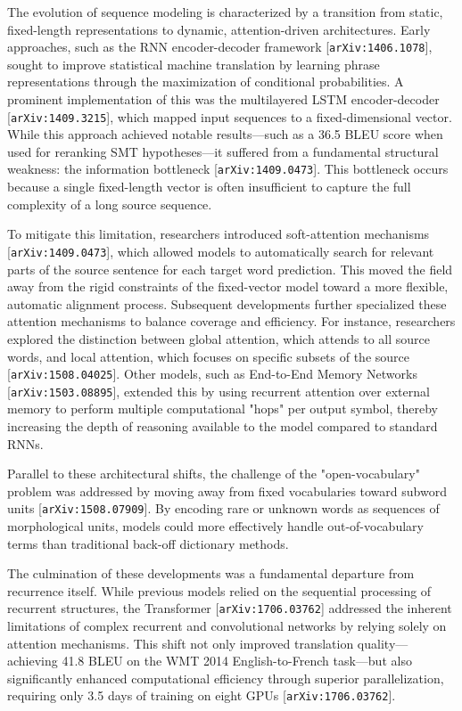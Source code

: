 \documentclass[11pt]{article}
\begin{document}
The evolution of sequence modeling is characterized by a transition from static, fixed-length representations to dynamic, attention-driven architectures. Early approaches, such as the RNN encoder-decoder framework [\texttt{arXiv:1406.1078}], sought to improve statistical machine translation by learning phrase representations through the maximization of conditional probabilities. A prominent implementation of this was the multilayered LSTM encoder-decoder [\texttt{arXiv:1409.3215}], which mapped input sequences to a fixed-dimensional vector. While this approach achieved notable results—such as a 36.5 BLEU score when used for reranking SMT hypotheses—it suffered from a fundamental structural weakness: the information bottleneck [\texttt{arXiv:1409.0473}]. This bottleneck occurs because a single fixed-length vector is often insufficient to capture the full complexity of a long source sequence.

To mitigate this limitation, researchers introduced soft-attention mechanisms [\texttt{arXiv:1409.0473}], which allowed models to automatically search for relevant parts of the source sentence for each target word prediction. This moved the field away from the rigid constraints of the fixed-vector model toward a more flexible, automatic alignment process. Subsequent developments further specialized these attention mechanisms to balance coverage and efficiency. For instance, researchers explored the distinction between global attention, which attends to all source words, and local attention, which focuses on specific subsets of the source [\texttt{arXiv:1508.04025}]. Other models, such as End-to-End Memory Networks [\texttt{arXiv:1503.08895}], extended this by using recurrent attention over external memory to perform multiple computational "hops" per output symbol, thereby increasing the depth of reasoning available to the model compared to standard RNNs.

Parallel to these architectural shifts, the challenge of the "open-vocabulary" problem was addressed by moving away from fixed vocabularies toward subword units [\texttt{arXiv:1508.07909}]. By encoding rare or unknown words as sequences of morphological units, models could more effectively handle out-of-vocabulary terms than traditional back-off dictionary methods.

The culmination of these developments was a fundamental departure from recurrence itself. While previous models relied on the sequential processing of recurrent structures, the Transformer [\texttt{arXiv:1706.03762}] addressed the inherent limitations of complex recurrent and convolutional networks by relying solely on attention mechanisms. This shift not only improved translation quality—achieving 41.8 BLEU on the WMT 2014 English-to-French task—but also significantly enhanced computational efficiency through superior parallelization, requiring only 3.5 days of training on eight GPUs [\texttt{arXiv:1706.03762}].
\end{document}
